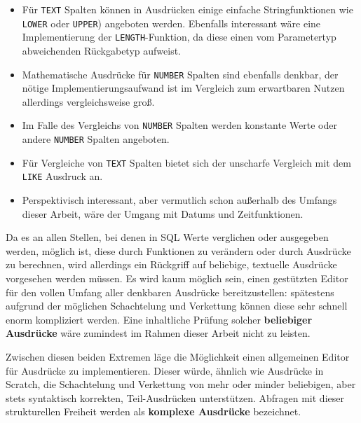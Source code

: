 \begin{itemize}
\item Für \texttt{TEXT} Spalten können in Ausdrücken einige einfache Stringfunktionen wie \texttt{LOWER} oder \texttt{UPPER}) angeboten werden. Ebenfalls interessant wäre eine Implementierung der \texttt{LENGTH}-Funktion, da diese einen vom Parametertyp abweichenden Rückgabetyp aufweist.
\item Mathematische Ausdrücke für \texttt{NUMBER} Spalten sind ebenfalls denkbar, der nötige Implementierungsaufwand ist im Vergleich zum erwartbaren Nutzen allerdings vergleichsweise groß.
\item Im Falle des Vergleichs von \texttt{NUMBER} Spalten werden konstante Werte oder andere \texttt{NUMBER} Spalten angeboten.
\item Für Vergleiche von \texttt{TEXT} Spalten bietet sich der unscharfe Vergleich mit dem \texttt{LIKE} Ausdruck an.
\item Perspektivisch interessant, aber vermutlich schon außerhalb des Umfangs dieser Arbeit, wäre der Umgang mit Datums und Zeitfunktionen.
\end{itemize}

Da es an allen Stellen, bei denen in SQL Werte verglichen oder ausgegeben werden, möglich ist, diese durch Funktionen zu verändern oder durch Ausdrücke zu berechnen, wird allerdings ein Rückgriff auf beliebige, textuelle Ausdrücke vorgesehen werden müssen. Es wird kaum möglich sein, einen gestützten Editor für den vollen Umfang aller denkbaren Ausdrücke bereitzustellen: spätestens aufgrund der möglichen Schachtelung und Verkettung können diese sehr schnell enorm kompliziert werden. Eine inhaltliche Prüfung solcher \textbf{beliebiger Ausdrücke} wäre zumindest im Rahmen dieser Arbeit nicht zu leisten.

Zwischen diesen beiden Extremen läge die Möglichkeit einen allgemeinen Editor für Ausdrücke zu implementieren. Dieser würde, ähnlich wie Ausdrücke in Scratch, die Schachtelung und Verkettung von mehr oder minder beliebigen, aber stets syntaktisch korrekten, Teil-Ausdrücken unterstützen. Abfragen mit dieser strukturellen Freiheit werden als \textbf{komplexe Ausdrücke} bezeichnet.


